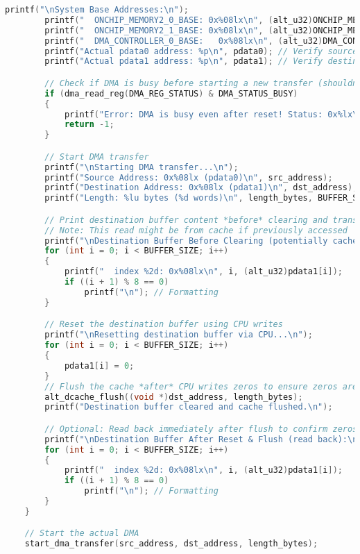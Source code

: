 \begin{lstlisting}[language=C, caption={hello\_world.c - Nios V DMA Test Application}, label=lst:c_helloworld]
        printf("\nSystem Base Addresses:\n");
        printf("  ONCHIP_MEMORY2_0_BASE: 0x%08lx\n", (alt_u32)ONCHIP_MEMORY2_0_BASE);
        printf("  ONCHIP_MEMORY2_1_BASE: 0x%08lx\n", (alt_u32)ONCHIP_MEMORY2_1_BASE);
        printf("  DMA_CONTROLLER_0_BASE:   0x%08lx\n", (alt_u32)DMA_CONTROLLER_0_BASE);
        printf("Actual pdata0 address: %p\n", pdata0); // Verify source location
        printf("Actual pdata1 address: %p\n", pdata1); // Verify destination location

        // Check if DMA is busy before starting a new transfer (shouldn't be after reset)
        if (dma_read_reg(DMA_REG_STATUS) & DMA_STATUS_BUSY)
        {
            printf("Error: DMA is busy even after reset! Status: 0x%lx\n", dma_read_reg(DMA_REG_STATUS));
            return -1;
        }

        // Start DMA transfer
        printf("\nStarting DMA transfer...\n");
        printf("Source Address: 0x%08lx (pdata0)\n", src_address);
        printf("Destination Address: 0x%08lx (pdata1)\n", dst_address);
        printf("Length: %lu bytes (%d words)\n", length_bytes, BUFFER_SIZE);

        // Print destination buffer content *before* clearing and transfer
        // Note: This read might be from cache if previously accessed
        printf("\nDestination Buffer Before Clearing (potentially cached):\n");
        for (int i = 0; i < BUFFER_SIZE; i++)
        {
            printf("  index %2d: 0x%08lx\n", i, (alt_u32)pdata1[i]);
            if ((i + 1) % 8 == 0)
                printf("\n"); // Formatting
        }

        // Reset the destination buffer using CPU writes
        printf("\nResetting destination buffer via CPU...\n");
        for (int i = 0; i < BUFFER_SIZE; i++)
        {
            pdata1[i] = 0;
        }
        // Flush the cache *after* CPU writes zeros to ensure zeros are in memory
        alt_dcache_flush((void *)dst_address, length_bytes);
        printf("Destination buffer cleared and cache flushed.\n");

        // Optional: Read back immediately after flush to confirm zeros
        printf("\nDestination Buffer After Reset & Flush (read back):\n");
        for (int i = 0; i < BUFFER_SIZE; i++)
        {
            printf("  index %2d: 0x%08lx\n", i, (alt_u32)pdata1[i]);
            if ((i + 1) % 8 == 0)
                printf("\n"); // Formatting
        }
    }

    // Start the actual DMA
    start_dma_transfer(src_address, dst_address, length_bytes);


\end{lstlisting}
